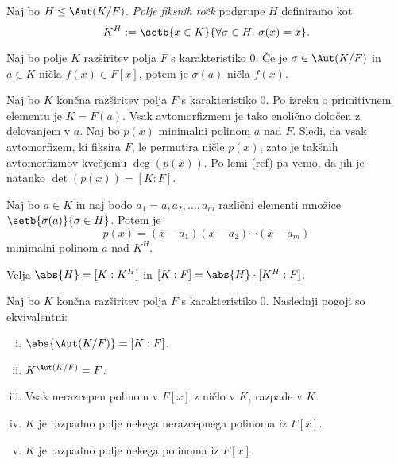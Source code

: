 \begin{definicija}
    Naj bo $H \le \Aut(K/F)$. \emph{Polje fiksnih točk} podgrupe $H$ definiramo kot
    \[
        K^H := \setb{x \in K}{\forall \sigma \in H.~\sigma(x)=x}.
    \]
\end{definicija}

\begin{lema}
    Naj bo polje $K$ razširitev polja $F$ s karakteristiko $0$.
    Če je $\sigma \in \Aut(K/F)$ in $a \in K$ ničla $f(x) \in F[x]$, potem je 
    $\sigma(a)$ ničla $f(x)$. 
\end{lema}

%    

\begin{opomba}
    Naj bo $K$ končna razširitev polja $F$ s karakteristiko $0$. Po izreku o 
    primitivnem elementu je $K = F(a)$. Vsak avtomorfizmem je tako enolično 
    določen z delovanjem v $a$. Naj bo $p(x)$ minimalni polinom $a$ nad $F$. 
    Sledi, da vsak avtomorfizem, ki fiksira $F$, le permutira ničle $p(x)$, 
    zato je takšnih avtomorfizmov kvečjemu $\deg(p(x))$. Po lemi (ref) %
    pa vemo, da jih je natanko $\det(p(x)) = [K:F]$.
\end{opomba}

\begin{lema}
    Naj bo $a \in K$ in naj bodo $a_1=a, a_2, \dots, a_m$ različni
    elementi množice $\setb{\sigma(a)}{\sigma \in H}$. Potem je 
    \[
        p(x) = (x - a_1) (x - a_2) \cdots (x - a_m)
    \]
    minimalni polinom $a$ nad $K^H$.
\end{lema}

%    

\begin{lema}
    Velja $\abs{H} = [K : K^H]$ in $[K : F] = \abs{H} \cdot [K^H : F]$.
\end{lema}

%    

\begin{izrek}
    Naj bo $K$ končna razširitev polja $F$ s karakteristiko $0$. Naslednji pogoji 
    so ekvivalentni:
    \begin{enumerate}[(i)]
        \item $\abs{\Aut(K/F)} = [K:F]$.
        \item $K^{\Aut(K/F)} = F$.
        \item Vsak nerazcepen polinom v $F[x]$ z ničlo v $K$, razpade v $K$.
        \item $K$ je razpadno polje nekega nerazcepnega polinoma iz $F[x]$.
        \item $K$ je razpadno polje nekega polinoma iz $F[x]$.
    \end{enumerate}
    \label{thm:1}
\end{izrek}

